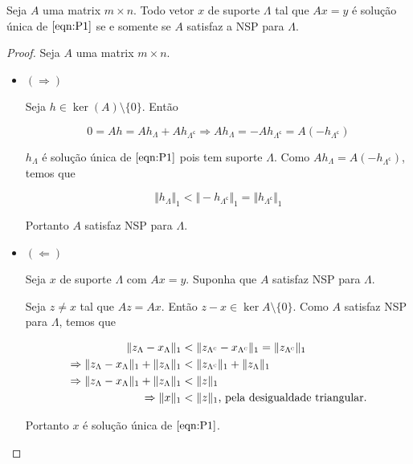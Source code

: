 \begin{teorema}
Seja $A$ uma matrix $m \times n$. Todo vetor $x$ de suporte $\Lambda$ tal que $Ax = y$ é solução única de $\eqref{eqn:P1}$ se e somente se $A$ satisfaz a NSP para $\Lambda$.
\label{thm:TeoremaNSP}
\end{teorema}
\begin{proof}
Seja $A$ uma matrix $m \times n$.
\begin{itemize}

\item $( \Rightarrow )$

Seja $h \in \ker(A) \setminus \lbrace 0 \rbrace$. Então

$$ 0 = Ah = Ah_{\Lambda} + Ah_{\Lambda^{\mathsf{c}}} \Rightarrow Ah_{\Lambda} = - Ah_{\Lambda^{\mathsf{c}}} = A( -h_{\Lambda^{\mathsf{c}}} )$$

$h_{\Lambda}$ é solução única de $\eqref{eqn:P1}$ pois tem suporte $\Lambda$. Como $Ah_{\Lambda} = A( -h_{\Lambda^{\mathsf{c}}} )$, temos que

$$ \Vert h_{\Lambda} \Vert_1 < \Vert - h_{\Lambda^{\mathsf{c}}} \Vert_1
= \Vert h_{\Lambda^{\mathsf{c}}} \Vert_1 $$

Portanto $A$ satisfaz NSP para $\Lambda$.

\item $( \Leftarrow )$

Seja $x$ de suporte $\Lambda$ com $Ax = y$. Suponha que $A$ satisfaz NSP para $\Lambda$.

Seja $z \neq x$ tal que $Az = Ax$. Então $z - x \in \ker{A} \setminus \lbrace 0 \rbrace$. Como $A$ satisfaz NSP para $\Lambda$, temos que

\begin{subequations}
\begin{align*}
\Vert z_{\Lambda} - x_{\Lambda} \Vert_1 &< \Vert z_{\Lambda^{\textsc{c}}} - x_{\Lambda^{\textsc{c}}} \Vert_1
 = \Vert z_{\Lambda^{\textsc{c}}} \Vert_1 \\
\Rightarrow \Vert z_{\Lambda} - x_{\Lambda} \Vert_1 + \Vert z_{\Lambda} \Vert_1 &< \Vert z_{\Lambda^{\textsc{c}}} \Vert_1 + \Vert z_{\Lambda} \Vert_1 \\
\Rightarrow \Vert z_{\Lambda} - x_{\Lambda} \Vert_1 + \Vert z_{\Lambda} \Vert_1 & < \Vert z \Vert_1 \\
\Rightarrow \Vert x \Vert_1 &< \Vert z \Vert_1 \text{, pela desigualdade triangular.}
\end{align*}
\end{subequations}

Portanto $x$ é solução única de $\eqref{eqn:P1}$.



\end{itemize}
\end{proof}


